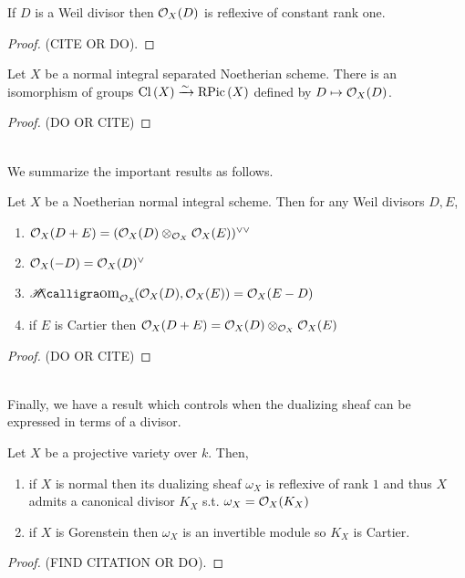 \documentclass[12pt]{article}
\begin{document}
\begin{prop}
If $D$ is a Weil divisor then $\mathcal{O}_{X}(D)$ is reflexive of constant rank one. 
\end{prop}

\begin{proof}
(CITE OR DO).
\end{proof}

\begin{theorem} 
Let $X$ be a normal integral separated Noetherian scheme. There is an isomorphism of groups $\mathrm{Cl} \left( X \right) \xrightarrow{\sim} \mathrm{RPic}\left( X \right)$ defined by $D \mapsto \mathcal{O}_{X}(D)$.
\end{theorem}

\begin{proof}
(DO OR CITE)
\end{proof}
\noindent\\
We summarize the important results as follows.
\begin{theorem} \label{properties_of_reflexive_sheaves}
Let $X$ be a Noetherian normal integral scheme. Then for any Weil divisors $D, E$,
\begin{enumerate}
\item $\mathcal{O}_{X}(D + E) = (\mathcal{O}_{X}(D) \otimes_{\mathcal{O}_{X}} \mathcal{O}_{X}(E))^{\vee \vee}$
\item $\mathcal{O}_{X}(-D) = \mathcal{O}_{X}(D)^\vee$
\item $\shHom{\struct{X}}{\struct{X}(D)}{\struct{X}(E)} = \struct{X}(E - D)$
\item if $E$ is Cartier then $\mathcal{O}_{X}(D + E) = \mathcal{O}_{X}(D) \otimes_{\mathcal{O}_{X}} \mathcal{O}_{X}(E)$
\end{enumerate}
\begin{center}

\begin{proof}
(DO OR CITE)
\end{proof}

\end{center}
\end{theorem}
\noindent\\
Finally, we have a result which controls when the dualizing sheaf can be expressed in terms of a divisor.
\begin{prop}
Let $X$ be a projective variety over $k$. Then,
\begin{enumerate}
\item if $X$ is normal then its dualizing sheaf $\omega_X$ is reflexive of rank $1$ and thus $X$ admits a canonical divisor $K_X$ s.t. $\omega_X = \mathcal{O}_{X}(K_X)$
\item if $X$ is Gorenstein then $\omega_X$ is an invertible module so $K_X$ is Cartier.
\end{enumerate}
\end{prop}

\begin{proof}
(FIND CITATION OR DO).
\end{proof}
\end{document}
